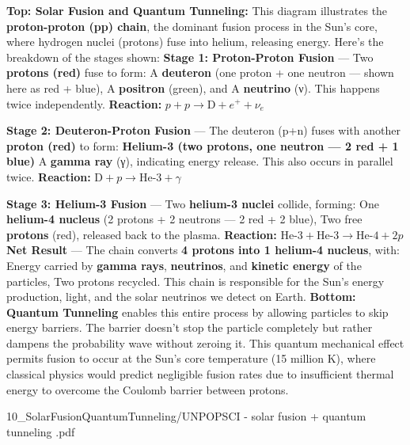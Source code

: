 \begin{SideNotePage}{
  \textbf{Top: Solar Fusion and Quantum Tunneling:} This diagram illustrates the \textbf{proton-proton (pp) chain}, the dominant fusion process in the Sun's core, where hydrogen nuclei (protons) fuse into helium, releasing energy. Here's the breakdown of the stages shown:
  \vspace{1em}
  \textbf{Stage 1: Proton-Proton Fusion} — Two \textbf{protons (red)} fuse to form: A \textbf{deuteron} (one proton + one neutron — shown here as red + blue), A \textbf{positron} (green), and A \textbf{neutrino} (ν). This happens twice independently. \textbf{Reaction:} $p + p \rightarrow \text{D} + e^+ + \nu_e$
  
  \vspace{1em}
  \textbf{Stage 2: Deuteron-Proton Fusion} — The deuteron (p+n) fuses with another \textbf{proton (red)} to form: \textbf{Helium-3 (two protons, one neutron — 2 red + 1 blue)} A \textbf{gamma ray} (γ), indicating energy release. This also occurs in parallel twice. \textbf{Reaction:} $\text{D} + p \rightarrow \text{He-3} + \gamma$

  \vspace{1em}
  \textbf{Stage 3: Helium-3 Fusion} — Two \textbf{helium-3 nuclei} collide, forming: One \textbf{helium-4 nucleus} (2 protons + 2 neutrons — 2 red + 2 blue), Two free \textbf{protons} (red), released back to the plasma. \textbf{Reaction:} $\text{He-3} + \text{He-3} \rightarrow \text{He-4} + 2p$
  \vspace{1em}
  \textbf{Net Result} — The chain converts \textbf{4 protons into 1 helium-4 nucleus}, with: Energy carried by \textbf{gamma rays}, \textbf{neutrinos}, and \textbf{kinetic energy} of the particles, Two protons recycled. This chain is responsible for the Sun's energy production, light, and the solar neutrinos we detect on Earth.
  \vspace{3em}
  \textbf{Bottom: Quantum Tunneling} enables this entire process by allowing particles to skip energy barriers. The barrier doesn't stop the particle completely but rather dampens the probability wave without zeroing it. This quantum mechanical effect permits fusion to occur at the Sun's core temperature (15 million K), where classical physics would predict negligible fusion rates due to insufficient thermal energy to overcome the Coulomb barrier between protons.
}{10_SolarFusionQuantumTunneling/UNPOPSCI - solar fusion + quantum tunneling .pdf}
\end{SideNotePage}